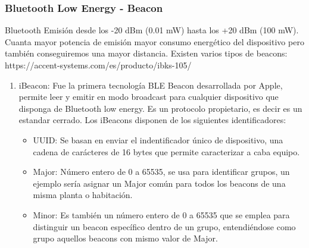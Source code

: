 \documentclass[a4paper ,12pt, onecolumn]{article}
\begin{document}
        \subsubsection {Bluetooth Low Energy - Beacon}
            Bluetooth 
            Emisión desde los -20 dBm (0.01 mW) hasta los +20 dBm (100 mW). Cuanta mayor potencia de emisión mayor consumo energético
            del dispositivo pero también conseguiremos una mayor distancia.
            Existen varios tipos de beacons:
            https://accent-systems.com/es/producto/ibks-105/
            \begin{enumerate}
                \item iBeacon: Fue la primera tecnología BLE Beacon desarrollada por Apple, permite leer y emitir en modo 
                broadcast para cualquier dispositivo que disponga de Bluetooth low energy. Es un protocolo propietario, es 
                decir es un estandar cerrado. 
                Los iBeacons disponen de los siguientes identificadores:
                \begin{itemize}
                    \item UUID: Se basan en enviar el indentificador único de dispositivo, una cadena de
                    carácteres de 16 bytes que permite caracterizar a caba equipo.
                    \item Major: Número entero de 0 a 65535, se usa para identificar grupos, un ejemplo sería 
                    asignar un Major común para todos los beacons de una misma planta o habitación.
                    \item Minor: Es también un número entero de 0 a 65535 que se emplea para distinguir un beacon
                    específico dentro de un grupo, entendiéndose como grupo aquellos beacons con mismo valor de Major.
                \end{itemize}

\end{enumerate}
\end{document}
